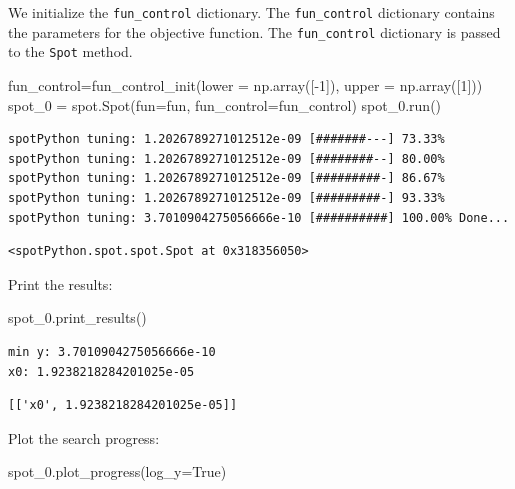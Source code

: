 \documentclass[
  letterpaper,
  DIV=11,
  numbers=noendperiod]{scrreprt}
\newenvironment{Shaded}{\begin{snugshade}}{\end{snugshade}}
\newcommand{\DecValTok}[1]{\textcolor[rgb]{0.68,0.00,0.00}{#1}}
\newcommand{\NormalTok}[1]{\textcolor[rgb]{0.00,0.23,0.31}{#1}}
\newcommand{\OperatorTok}[1]{\textcolor[rgb]{0.37,0.37,0.37}{#1}}
\newcommand{\VariableTok}[1]{\textcolor[rgb]{0.07,0.07,0.07}{#1}}
\begin{document}
We initialize the \texttt{fun\_control} dictionary. The
\texttt{fun\_control} dictionary contains the parameters for the
objective function. The \texttt{fun\_control} dictionary is passed to
the \texttt{Spot} method.

\begin{Shaded}
\begin{Highlighting}[]
\NormalTok{fun\_control}\OperatorTok{=}\NormalTok{fun\_control\_init(lower }\OperatorTok{=}\NormalTok{ np.array([}\OperatorTok{{-}}\DecValTok{1}\NormalTok{]),}
\NormalTok{                     upper }\OperatorTok{=}\NormalTok{ np.array([}\DecValTok{1}\NormalTok{]))}
\NormalTok{spot\_0 }\OperatorTok{=}\NormalTok{ spot.Spot(fun}\OperatorTok{=}\NormalTok{fun,}
\NormalTok{                   fun\_control}\OperatorTok{=}\NormalTok{fun\_control)}
\NormalTok{spot\_0.run()}
\end{Highlighting}
\end{Shaded}

\begin{verbatim}
spotPython tuning: 1.2026789271012512e-09 [#######---] 73.33% 
spotPython tuning: 1.2026789271012512e-09 [########--] 80.00% 
spotPython tuning: 1.2026789271012512e-09 [#########-] 86.67% 
spotPython tuning: 1.2026789271012512e-09 [#########-] 93.33% 
spotPython tuning: 3.7010904275056666e-10 [##########] 100.00% Done...
\end{verbatim}

\begin{verbatim}
<spotPython.spot.spot.Spot at 0x318356050>
\end{verbatim}

Print the results:

\begin{Shaded}
\begin{Highlighting}[]
\NormalTok{spot\_0.print\_results()}
\end{Highlighting}
\end{Shaded}

\begin{verbatim}
min y: 3.7010904275056666e-10
x0: 1.9238218284201025e-05
\end{verbatim}

\begin{verbatim}
[['x0', 1.9238218284201025e-05]]
\end{verbatim}

Plot the search progress:

\begin{Shaded}
\begin{Highlighting}[]
\NormalTok{spot\_0.plot\_progress(log\_y}\OperatorTok{=}\VariableTok{True}\NormalTok{)}
\end{Highlighting}
\end{Shaded}
\end{document}
